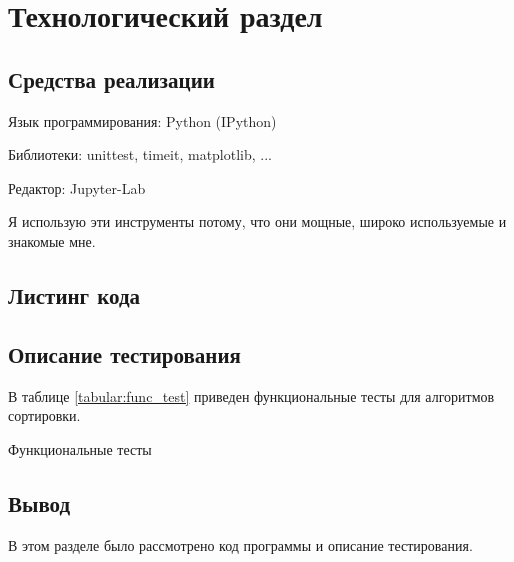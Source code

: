 \chapter{Технологический раздел}
\label{cha:impl}



\section{Средства реализации}

Язык программирования: Python (IPython)

Библиотеки: unittest, timeit, matplotlib, ...

Редактор: Jupyter-Lab

Я использую эти инструменты потому, что они мощные, широко
используемые и знакомые мне.


\section{Листинг кода}




\vbox{}



\pagebreak


\pagebreak
\section{Описание тестирования}

В таблице \ref{tabular:func_test} приведен функциональные тесты
для алгоритмов сортировки.

\def\arraystretch{1.2}
\setlength\tabcolsep{1cm}

\begin{table}[h]
    \centering
    \caption{\label{tabular:func_test} Функциональные тесты}
\end{table}

\setlength\tabcolsep{0.5cm}

\section{Вывод}

В этом разделе было рассмотрено код программы и описание тестирования.